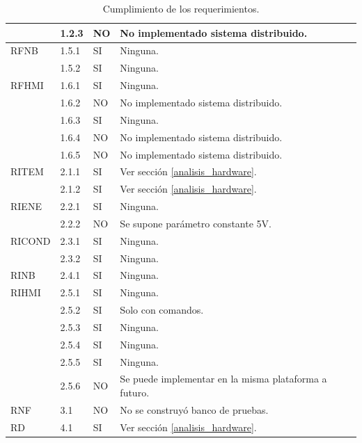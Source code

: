 \begin{table}[h!]
\begin{flushleft}
\begin{tabular}{|m{2.6cm}|m{1.5cm}|m{1.5cm}|m{6.8cm}|}
\multicolumn{1}{|l|}{} & { 1.2.3 } & { NO } & { No implementado sistema distribuido. }\\ \hline
\multicolumn{1}{|l|}{RFNB} & { 1.5.1 } & { SI } & { Ninguna. }\\ \cline{ 2- 4} 
\multicolumn{1}{|l|}{} & { 1.5.2 } & { SI } & { Ninguna. }\\ \hline
\multicolumn{1}{|l|}{RFHMI} & { 1.6.1 } & { SI } & { Ninguna. }\\ \cline{ 2- 4} 
\multicolumn{1}{|l|}{} & { 1.6.2 } & { NO } & { No implementado sistema distribuido. }\\ \cline{ 2- 4} 
\multicolumn{1}{|l|}{} & { 1.6.3 } & { SI } & { Ninguna. }\\ \cline{ 2- 4} 
\multicolumn{1}{|l|}{} & { 1.6.4 } & { NO } & { No implementado sistema distribuido. }\\ \cline{ 2- 4} 
\multicolumn{1}{|l|}{} & { 1.6.5 } & { NO } & { No implementado sistema distribuido. }\\ \hline 
\multicolumn{1}{|l|}{RITEM} & { 2.1.1 } & { SI } & { Ver sección \ref{analisis_hardware}. }\\ \cline{ 2- 4} 
\multicolumn{1}{|l|}{} & { 2.1.2 } & { SI } & { Ver sección \ref{analisis_hardware}. }\\ \hline 
\multicolumn{1}{|l|}{RIENE} & { 2.2.1 } & { SI } & { Ninguna. }\\ \cline{ 2- 4} 
\multicolumn{1}{|l|}{} & { 2.2.2 } & { NO } & { Se supone parámetro constante 5V. }\\ \hline
\multicolumn{1}{|l|}{RICOND} & { 2.3.1 } & { SI } & { Ninguna. }\\ \cline{ 2- 4} 
\multicolumn{1}{|l|}{} & { 2.3.2 } & { SI } & { Ninguna. }\\ \hline
\multicolumn{1}{|l|}{RINB} & { 2.4.1 } & { SI } & { Ninguna. }\\ \hline
\multicolumn{1}{|l|}{RIHMI} & { 2.5.1 } & { SI } & { Ninguna. }\\ \cline{ 2- 4} 
\multicolumn{1}{|l|}{} & { 2.5.2 } & { SI } & { Solo con comandos. }\\ \cline{ 2- 4} 
\multicolumn{1}{|l|}{} & { 2.5.3 } & { SI } & { Ninguna. }\\ \cline{ 2- 4} 
\multicolumn{1}{|l|}{} & { 2.5.4 } & { SI } & { Ninguna. }\\ \cline{ 2- 4} 
\multicolumn{1}{|l|}{} & { 2.5.5 } & { SI } & { Ninguna. }\\ \cline{ 2- 4} 
\multicolumn{1}{|l|}{} & { 2.5.6 } & { NO } & { Se puede implementar en la misma plataforma a futuro. }\\ \hline
\multicolumn{1}{|l|}{RNF} & { 3.1 } & { NO } & { No se construyó banco de pruebas. }\\ \hline 
\multicolumn{1}{|l|}{RD} & { 4.1 } & { SI } & { Ver sección \ref{analisis_hardware}.}\\ \hline 
\end{tabular}
\end{flushleft}
\caption{ Cumplimiento de los requerimientos.}
\label{tablas_cumplimiento_req}
\end{table}

